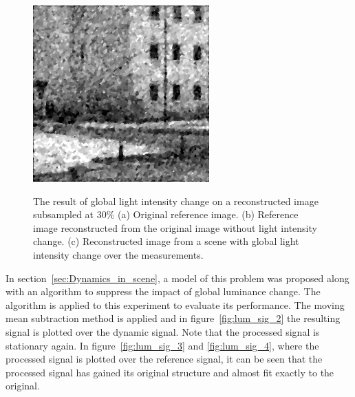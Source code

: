 \begin{figure}[H]
\begin{minipage}[t]{0.32\textwidth}
    \subcaption{}
    \label{fig:lum_2}
\end{minipage}
\begin{minipage}[t]{0.32\textwidth}
    \includegraphics[width = \textwidth]{result/dynamic/lum/intense_change_psnr_19_snr_14_sssim_38.png}
    \subcaption{}
    \label{fig:lum_3}
\end{minipage}
    \caption{The result of global light intensity change on a reconstructed image subsampled at 30\% (a) Original reference image. (b) Reference image reconstructed from the original image without light intensity change. (c) Reconstructed image from a scene with global light intensity change over the measurements.}
    \label{fig:lum_dyn}
\end{figure}

In section~\ref{sec:Dynamics_in_scene}, a model of this problem was proposed along with an algorithm to suppress the impact of global luminance change. The algorithm is applied to this experiment to evaluate its performance. The moving mean subtraction method is applied and in figure~\ref{fig:lum_sig_2} the resulting signal is plotted over the dynamic signal. Note that the processed signal is stationary again. In figure~\ref{fig:lum_sig_3} and \ref{fig:lum_sig_4}, where the processed signal is plotted over the reference signal, it can be seen that the processed signal has gained its original structure and almost fit exactly to the original.


